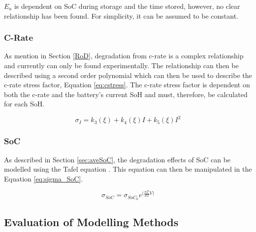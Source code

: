 \documentclass[a4paper, 10pt]{article}
\numberwithin{equation}{section}
\begin{document}
$E_a$ is dependent on SoC during storage and the time stored, however, no clear relationship has been found. For simplicity, it can be assumed to be constant. 

\subsubsection*{C-Rate}
As mention in Section \ref{RoD}, degradation from c-rate is a complex relationship and currently can only be found experimentally. The relationship can then be described using a second order polynomial which can then be used to describe the c-rate stress factor, Equation \ref{eq:cstress}. The c-rate stress factor is dependent on both the c-rate and the battery's current SoH and must, therefore, be calculated for each SoH.

\begin{equation}
\label{eq:cstress}
    \sigma_I=k_3(\xi)+k_4(\xi)I+k_5(\xi)I^2
\end{equation}


\subsubsection*{SoC}
As described in Section \ref{sec:aveSoC}, the degradation effects of SoC can be modelled using the Tafel equation \cite{book:aveSoC}. This equation can then be manipulated in the Equation \ref{eq:sigma_SoC}.

\begin{equation}
\label{eq:sigma_SoC}
    \sigma_{SoC}=\sigma_{SoC_0}e^{\big(\frac{\alpha F}{RT}V\big)}
\end{equation}


\subsection{Evaluation of Modelling Methods}

\end{document}
